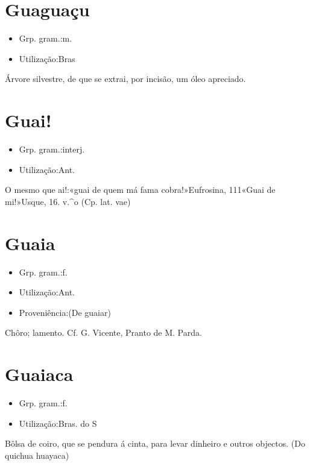 \section{Guaguaçu}
\begin{itemize}
\item {Grp. gram.:m.}
\end{itemize}
\begin{itemize}
\item {Utilização:Bras}
\end{itemize}
Árvore silvestre, de que se extrai, por incisão, um óleo apreciado.
\section{Guai!}
\begin{itemize}
\item {Grp. gram.:interj.}
\end{itemize}
\begin{itemize}
\item {Utilização:Ant.}
\end{itemize}
O mesmo que \textunderscore ai!\textunderscore :«\textunderscore guai de quem má fama cobra!\textunderscore »\textunderscore Eufrosina\textunderscore , 111«\textunderscore Guai de mi!\textunderscore »Usque, 16. v.^o
(Cp. lat. \textunderscore vae\textunderscore )
\section{Guaia}
\begin{itemize}
\item {Grp. gram.:f.}
\end{itemize}
\begin{itemize}
\item {Utilização:Ant.}
\end{itemize}
\begin{itemize}
\item {Proveniência:(De \textunderscore guaiar\textunderscore )}
\end{itemize}
Chôro; lamento. Cf. G. Vicente, \textunderscore Pranto de M. Parda\textunderscore .
\section{Guaiaca}
\begin{itemize}
\item {Grp. gram.:f.}
\end{itemize}
\begin{itemize}
\item {Utilização:Bras. do S}
\end{itemize}
Bôlsa de coiro, que se pendura á cinta, para levar dinheiro e outros objectos.
(Do quichua \textunderscore huayaca\textunderscore )
